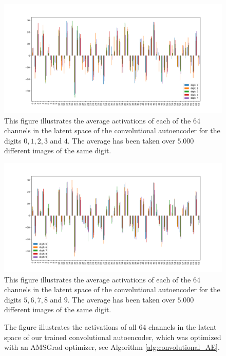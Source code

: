 \begin{figure}
\begin{center}
   \begin{minipage}[b]{\linewidth}
      \includegraphics[width=\linewidth]{convolutional_AE_latent_0}
      This figure illustrates the average activations of each of the $64$ channels in the latent space of the convolutional autoencoder for the digits $0, 1, 2, 3$ and  $4$. The average has been taken over $5.000$ different images of the same digit.
	\end{minipage}
   \begin{minipage}[b]{\linewidth}
      \includegraphics[width=\linewidth]{convolutional_AE_latent_1}
      This figure illustrates the average activations of each of the $64$ channels in the latent space of the convolutional autoencoder for the digits $5, 6, 7, 8$ and $9$. The average has been taken over $5.000$ different images of the same digit.
	\end{minipage}
\end{center}
\caption{The figure illustrates the activations of all $64$ channels in the latent space of our trained convolutional autoencoder, which was optimized with an AMSGrad optimizer, see Algorithm \ref{alg:convolutional_AE}.}\label{fig:convolutional_AE_latent}
\end{figure}

